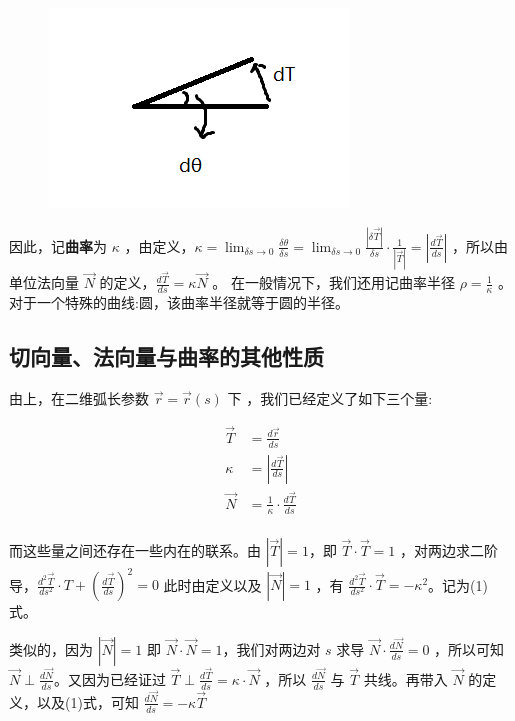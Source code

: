 \documentclass[fontset=windows]{article}
\begin{document}
\begin{figure}[htb]
	\centering
	\includegraphics[scale=1]{2.png}
	\caption{}
\end{figure}

因此，记\textbf{曲率}为 $\kappa$ ，由定义，$\kappa = \lim_{\delta s \rightarrow 0}{\frac{\delta \theta}{\delta s}} = \lim_{\delta s \rightarrow 0}{\frac{|\delta {\vec{T}}|}{\delta s}}\cdot{\frac1{|\vec{T}|}} = |\frac{d\vec T}{ds}|$ ，所以由单位法向量 $\vec{N}$ 的定义，$\frac{d\vec T}{ds} = \kappa \vec{N}$ 。 在一般情况下，我们还用记曲率半径 $\rho = \frac1{\kappa}$ 。对于一个特殊的曲线:圆，该曲率半径就等于圆的半径。

\subsection{切向量、法向量与曲率的其他性质}

由上，在二维弧长参数 $\vec{r} = \vec{r}(s)$ 下 ，我们已经定义了如下三个量:

$$
\begin{aligned}
\vec{T} &= \frac{d\vec{r}}{ds} \\
\kappa  &= |\frac{d\vec{T}}{ds}| \\
\vec{N} &= \frac{1}{\kappa} \cdot \frac{d\vec{T}}{ds} \\
\end{aligned}
$$

而这些量之间还存在一些内在的联系。由 $|\vec{T}| = 1$，即 $\vec{T}\cdot\vec{T} = 1 $ ，对两边求二阶导，$\frac{d^2\vec{T}}{ds^2} \cdot T + (\frac{d\vec{T}}{ds})^2 = 0 $ 此时由定义以及 $|\vec{N}| = 1$ ，有 $\frac{d^2\vec{T}}{ds^2} \cdot \vec{T} = -\kappa^2$。记为(1)式。

类似的，因为 $|\vec{N}| = 1$ 即 $\vec{N}\cdot\vec{N} = 1$，我们对两边对 $s$ 求导 $\vec{N}\cdot \frac{d\vec{N}}{ds} = 0$ ，所以可知 $\vec{N} \perp \frac{d\vec{N}}{ds}$。又因为已经证过 $\vec{T} \perp \frac{d\vec{T}}{ds} = \kappa\cdot{\vec{N}}$ ，所以 $\frac{d\vec{N}}{ds} $ 与 $\vec{T}$ 共线。再带入 ${\vec N} $ 的定义，以及(1)式，可知 $\frac{d{\vec{N}}}{ds} = -\kappa \vec{T}$
\end{document}
